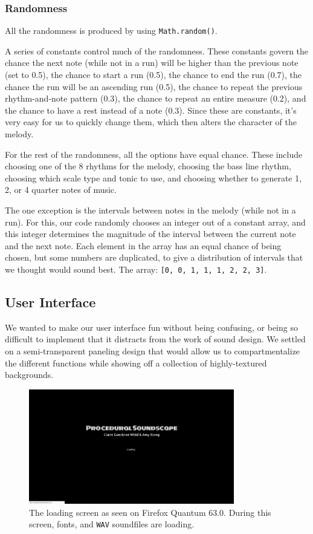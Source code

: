 \documentclass[12pt,a4paper]{article}
\newcommand{\code}{\texttt}
\newcommand{\lightcode}[1]{\colorbox{light-gray}{\texttt{#1}}}
\begin{document}
\subsubsection{Randomness}

All the randomness is produced by using \lightcode{Math.random()}.

A series of constants control much of the randomness. These constants govern the chance the next note (while not in a run) will be higher than the previous note (set to 0.5), the chance to start a run (0.5), the chance to end the run (0.7), the chance the run will be an ascending run (0.5), the chance to repeat the previous rhythm-and-note pattern (0.3), the chance to repeat an entire measure (0.2), and the chance to have a rest instead of a note (0.3). Since these are constants, it's very easy for us to quickly change them, which then alters the character of the melody.

For the rest of the randomness, all the options have equal chance. These include choosing one of the 8 rhythms for the melody, choosing the bass line rhythm, choosing which scale type and tonic to use, and choosing whether to generate 1, 2, or 4 quarter notes of music.

The one exception is the intervals between notes in the melody (while not in a run). For this, our code randomly chooses an integer out of a constant array, and this integer determines the magnitude of the interval between the current note and the next note. Each element in the array has an equal chance of being chosen, but some numbers are duplicated, to give a distribution of intervals that we thought would sound best. The array: \lightcode{[0, 0, 1, 1, 1, 2, 2, 3]}.

\subsection{User Interface}
We wanted to make our user interface fun without being confusing, or being so difficult to implement that it distracts from the work of sound design. We settled on a semi-transparent paneling design that would allow us to compartmentalize the different functions while showing off a collection of highly-textured backgrounds.

\begin{figure}
\centering\includegraphics[width=0.8\textwidth]{images/loading.png}
\caption{The loading screen as seen on Firefox Quantum 63.0. During this screen, fonts, and \code{WAV} soundfiles are loading.}
\end{figure}
\end{document}

